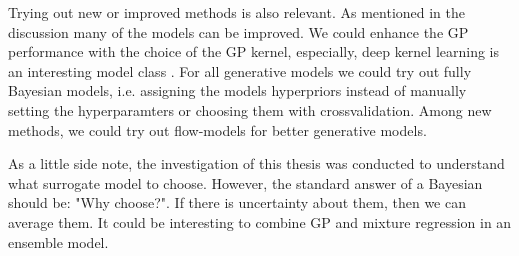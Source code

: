 Trying out new or improved methods is also relevant. As mentioned in the discussion many of the
models can be improved. We could enhance the GP performance with the choice of the GP kernel,
especially, deep kernel learning is an interesting model class \cite{DeepKernelLearning}. For all
generative models we could try out fully Bayesian models, i.e. assigning the models hyperpriors
instead of manually setting the hyperparamters or choosing them with crossvalidation. Among new
methods, we could try out flow-models for better generative models.

As a little side note, the investigation of this thesis was conducted to understand what surrogate
model to choose. However, the standard answer of a Bayesian should be: "Why choose?". If there is
uncertainty about them, then we can average them. It could be interesting to combine GP and mixture
regression in an ensemble model.
